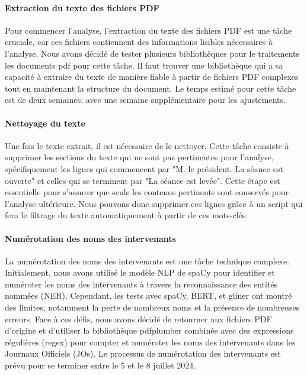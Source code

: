 \paragraph{Extraction du texte des fichiers \gls{PDF}}  
Pour commencer l'analyse, l'extraction du texte des fichiers \gls{PDF} est une tâche cruciale, car ces fichiers contiennent des informations lisibles nécessaires à l'analyse. Nous avons décidé de tester plusieurs bibliothèques pour le traitements les documents pdf pour cette tâche. Il faut trouver une \gls{bibliothèque} qui a sa capacité à extraire du texte de manière fiable à partir de fichiers \gls{PDF} complexes tout en maintenant la structure du document. Le temps estimé pour cette tâche est de deux semaines, avec une semaine supplémentaire pour les ajustements.

\paragraph{Nettoyage du texte}  
Une fois le texte extrait, il est nécessaire de le nettoyer. Cette tâche consiste à supprimer les sections du texte qui ne sont pas pertinentes pour l'analyse, spécifiquement les lignes qui commencent par "M. le président. La séance est ouverte" et celles qui se terminent par "La séance est levée". Cette étape est essentielle pour s'assurer que seuls les contenus pertinents sont conservés pour l'analyse ultérieure. Nous pouvons donc supprimer ces lignes grâce à un script qui fera le filtrage du texte automatiquement à partir de ces mots-clés.

\paragraph{Numérotation des noms des intervenants}  
La numérotation des noms des intervenants est une tâche technique complexe. Initialement, nous avons utilisé le modèle NLP de \gls{spaCy} pour identifier et numéroter les noms des intervenants à travers la reconnaissance des entités nommées (NER). Cependant, les tests avec \gls{spaCy}, \gls{BERT}, et \gls{gliner} ont montré des limites, notamment la perte de nombreux noms et la présence de nombreuses erreurs. Face à ces défis, nous avons décidé de retourner aux fichiers \gls{PDF} d'origine et d'utiliser la bibliothèque \gls{pdfplumber} combinée avec des expressions régulières (\gls{regex}) pour compter et numéroter les noms des intervenants dans les Journaux Officiels (JOs). Le processus de numérotation des intervenants est prévu pour se terminer entre le 5 et le 8 juillet 2024.

